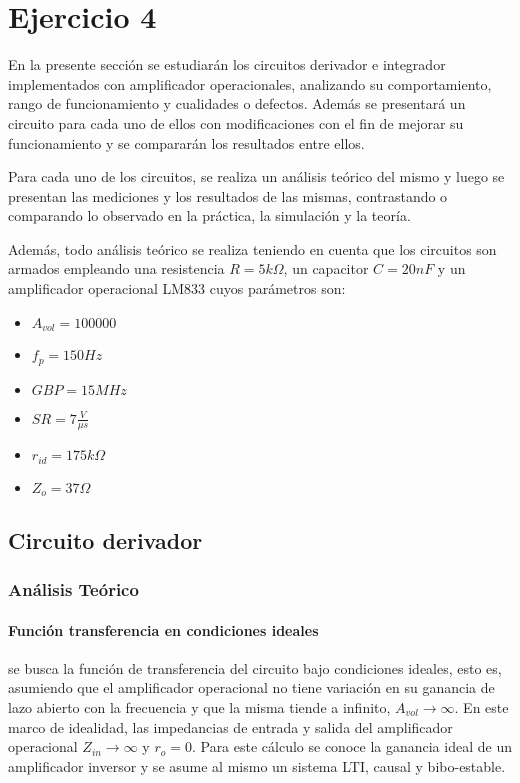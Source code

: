 



\section*{Ejercicio 4}
En la presente secci\'on se estudiar\'an los circuitos derivador e integrador implementados con amplificador operacionales, analizando su comportamiento, rango de funcionamiento y cualidades o defectos. Adem\'as se presentar\'a un circuito para cada uno de ellos con modificaciones con el fin de mejorar su funcionamiento y se comparar\'an los resultados entre ellos.

Para cada uno de los circuitos, se realiza un an\'alisis te\'orico del mismo y luego se presentan las mediciones y los resultados de las mismas, contrastando o comparando lo observado en la pr\'actica, la simulaci\'on y la teor\'ia.

Adem\'as, todo an\'alisis te\'orico se realiza teniendo en cuenta que los circuitos son armados empleando una resistencia $R = 5k \Omega$, un capacitor $C = 20nF$ y un amplificador operacional LM833 cuyos par\'ametros son:
\begin{itemize}
	\item $A_{vol} = 100000$
	\item $f_p = 150Hz$
	\item $GBP = 15MHz$
	\item $SR = 7 \frac{V}{\mu s}$
	\item $r_{id} = 175k \Omega$
	\item $Z_o = 37 \Omega$
\end{itemize}


	\subsection*{Circuito derivador}
 
\subsubsection*{An\'alisis Te\'orico}
	

\paragraph*{Funci\'on transferencia en condiciones ideales}se busca la funci\'on de transferencia del circuito bajo condiciones ideales, esto es, asumiendo que el amplificador operacional no tiene variaci\'on en su ganancia de lazo abierto con la frecuencia y que la misma tiende a infinito, $A_{vol} \to \infty$. En este marco de idealidad, las impedancias de entrada y salida del amplificador operacional $Z_{in} \to \infty$ y $r_o = 0$. Para este c\'alculo se conoce la ganancia ideal de un amplificador inversor y se asume al mismo un sistema LTI, causal y bibo-estable.

